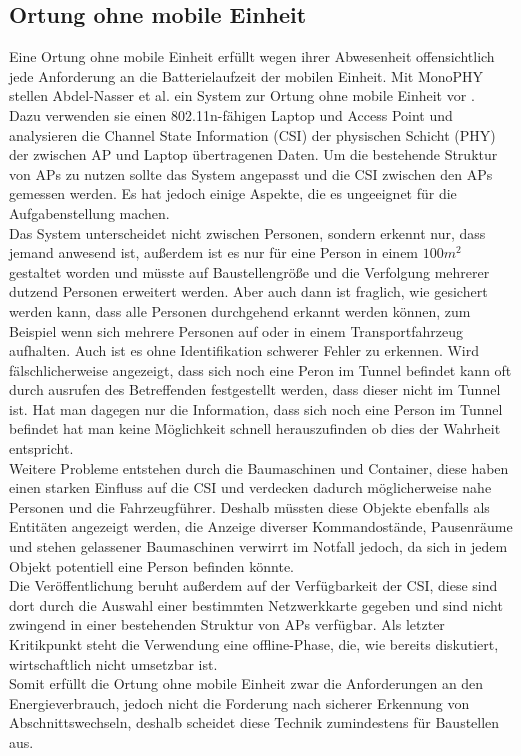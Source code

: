 \subsection{Ortung ohne mobile Einheit}
Eine Ortung ohne mobile Einheit erfüllt wegen ihrer Abwesenheit offensichtlich jede Anforderung an die Batterielaufzeit der mobilen Einheit.
Mit MonoPHY stellen Abdel-Nasser et al. ein System zur Ortung ohne mobile Einheit vor \cite{abdel2013monophy}. \\
Dazu verwenden sie einen 802.11n-fähigen Laptop und Access Point und analysieren die Channel State Information (CSI) der physischen Schicht (PHY) der zwischen AP und Laptop übertragenen Daten.
Um die bestehende Struktur von APs zu nutzen sollte das System angepasst und die CSI zwischen den APs gemessen werden.
Es hat jedoch einige Aspekte, die es ungeeignet für die Aufgabenstellung machen.\\
Das System unterscheidet nicht zwischen Personen, sondern erkennt nur, dass jemand anwesend ist, außerdem ist es nur für eine Person in einem $100m^2$ gestaltet worden und müsste auf Baustellengröße und die Verfolgung mehrerer dutzend Personen erweitert werden.
Aber auch dann ist fraglich, wie gesichert werden kann, dass alle Personen durchgehend erkannt werden können, zum Beispiel wenn sich mehrere Personen auf oder in einem Transportfahrzeug aufhalten.
Auch ist es ohne Identifikation schwerer Fehler zu erkennen. 
Wird fälschlicherweise angezeigt, dass sich noch eine Peron im Tunnel befindet kann oft durch ausrufen des Betreffenden festgestellt werden, dass dieser nicht im Tunnel ist. 
Hat man dagegen nur die Information, dass sich noch eine Person im Tunnel befindet hat man keine Möglichkeit schnell herauszufinden ob dies der Wahrheit entspricht.\\
Weitere Probleme entstehen durch die Baumaschinen und Container, diese haben einen starken Einfluss auf die CSI und verdecken dadurch möglicherweise nahe Personen und die Fahrzeugführer.
Deshalb müssten diese Objekte ebenfalls als Entitäten angezeigt werden, die Anzeige diverser Kommandostände, Pausenräume und stehen gelassener Baumaschinen verwirrt im Notfall jedoch, da sich in jedem Objekt potentiell eine Person befinden könnte.\\
Die Veröffentlichung beruht außerdem auf der Verfügbarkeit der CSI, diese sind dort durch die Auswahl einer bestimmten Netzwerkkarte gegeben und sind nicht zwingend in einer bestehenden Struktur von APs verfügbar.
Als letzter Kritikpunkt steht die Verwendung eine offline-Phase, die, wie bereits diskutiert, wirtschaftlich nicht umsetzbar ist. \\ 
Somit erfüllt die Ortung ohne mobile Einheit zwar die Anforderungen an den Energieverbrauch, jedoch nicht die Forderung nach sicherer Erkennung von Abschnittswechseln, deshalb scheidet diese Technik zumindestens für Baustellen aus.


